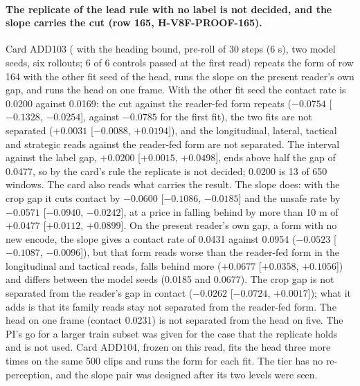 \paragraph{The replicate of the lead rule with no label is not decided, and the slope carries the cut (row 165, H-V8F-PROOF-165).} Card ADD103 ( with the heading bound, pre-roll of 30 steps (6 s), two model seeds, six rollouts; 6 of 6 controls passed at the first read) repeats the form of row 164 with the other fit seed of the head, runs the slope on the present reader's own gap, and runs the head on one frame. With the other fit seed the contact rate is 0.0200 against 0.0169: the cut against the reader-fed form repeats ($-0.0754$ [$-0.1328$, $-0.0254$], against $-0.0785$ for the first fit), the two fits are not separated ($+0.0031$ [$-0.0088$, $+0.0194$]), and the longitudinal, lateral, tactical and strategic reads against the reader-fed form are not separated. The interval against the label gap, $+0.0200$ [$+0.0015$, $+0.0498$], ends above half the gap of 0.0477, so by the card's rule the replicate is not decided; 0.0200 is 13 of 650 windows. The card also reads what carries the result. The slope does: with the crop gap it cuts contact by $-0.0600$ [$-0.1086$, $-0.0185$] and the unsafe rate by $-0.0571$ [$-0.0940$, $-0.0242$], at a price in falling behind by more than 10 m of $+0.0477$ [$+0.0112$, $+0.0899$]. On the present reader's own gap, a form with no new encode, the slope gives a contact rate of 0.0431 against 0.0954 ($-0.0523$ [$-0.1087$, $-0.0096$]), but that form reads worse than the reader-fed form in the longitudinal and tactical reads, falls behind more ($+0.0677$ [$+0.0358$, $+0.1056$]) and differs between the model seeds (0.0185 and 0.0677). The crop gap is not separated from the reader's gap in contact ($-0.0262$ [$-0.0724$, $+0.0017$]); what it adds is that its family reads stay not separated from the reader-fed form. The head on one frame (contact 0.0231) is not separated from the head on five. The PI's go for a larger train subset was given for the case that the replicate holds and is not used. Card ADD104, frozen on this read, fits the head three more times on the same 500 clips and runs the form for each fit. The tier has no re-perception, and the slope pair was designed after its two levels were seen.


